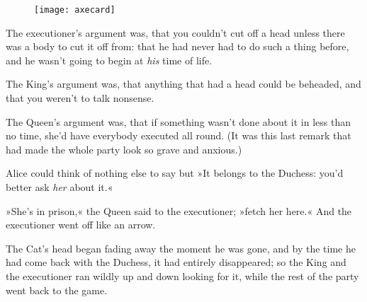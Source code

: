 \begin{figure}[tbh]
\centering
\texttt{[image: axecard]}
\end{figure}


The executioner's argument was, that you couldn't cut off a head unless there was a body to cut it off from: that he had never had to do such a thing before, and he wasn't going to begin at \textit{his} time of life.

The King's argument was, that anything that had a head could be beheaded, and that you weren't to talk nonsense.

The Queen's argument was, that if something wasn't done about it in less than no time, she'd have everybody executed all round. (It was this last remark that had made the whole party look so grave and anxious.)

Alice could think of nothing else to say but »It belongs to the Duchess: you'd better ask \textit{her} about it.«

»She's in prison,« the Queen said to the executioner; »fetch her here.« And the executioner went off like an arrow.

The Cat's head began fading away the moment he was gone, and by the time he had come back with the Duchess, it had entirely disappeared; so the King and the executioner ran wildly up and down looking for it, while the rest of the party went back to the game.